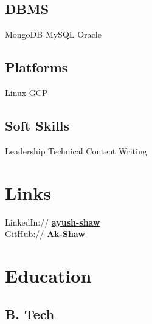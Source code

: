 \documentclass[]{deedy-resume-openfont}
\begin{document}
\begin{minipage}[t]{0.33\textwidth}
\subsection{DBMS}
MongoDB \textbullet{} MySQL \textbullet{} Oracle
\sectionsep

\subsection{Platforms}
Linux \textbullet{} GCP 
\sectionsep

\subsection{Soft Skills}
Leadership \textbullet{} Technical Content Writing 
\sectionsep


\section{Links} 
LinkedIn://  \href{https://www.linkedin.com/in/ayush-shaw}{\bf ayush-shaw} \\
GitHub://  \href{https://github.com/Ak-Shaw}{\bf Ak-Shaw} \\


\section{Education} 


\subsection{B. Tech} 
\sectionsep



\end{minipage}
\end{document}
